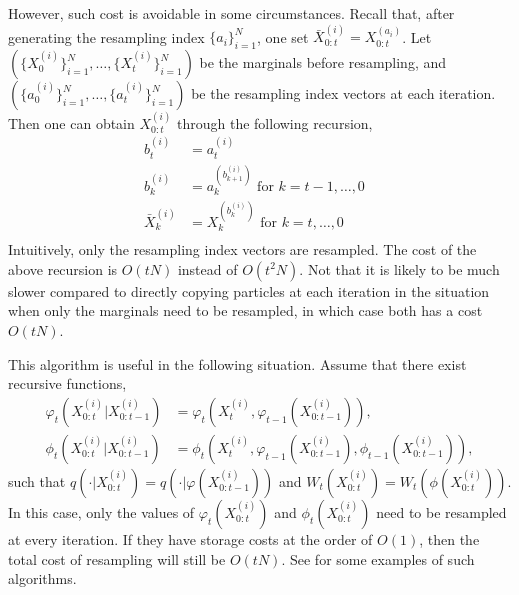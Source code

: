 However, such cost is avoidable in some circumstances. Recall that, after
generating the resampling index $\{a_i\}_{i=1}^N$, one set $\bar{X}_{0:t}^{(i)}
= X_{0:t}^{(a_i)}$. Let $(\{X_0^{(i)}\}_{i=1}^N,\dots,\{X_t^{(i)}\}_{i=1}^N)$
be the marginals before resampling, and
$(\{a_0^{(i)}\}_{i=1}^N,\dots,\{a_t^{(i)}\}_{i=1}^N)$ be the resampling index
vectors at each iteration. Then one can obtain $X_{0:t}^{(i)}$ through
the following recursion,
\begin{align*}
  b_t^{(i)} &= a_t^{(i)} & \\
  b_k^{(i)} &= a_{k}^{(b_{k + 1}^{(i)})} \text{ for } k = t - 1,\dots,0 \\
  \bar{X}_k^{(i)} &= X_k^{(b_k^{(i)})}   \text{ for } k = t,\dots,0\ \\
\end{align*}
Intuitively, only the resampling index vectors are resampled. The cost of the
above recursion is $O(tN)$ instead of $O(t^2N)$. Not that it is likely to be
much slower compared to directly copying particles at each iteration in the
situation when only the marginals need to be resampled, in which case both has
a cost $O(tN)$.

This algorithm is useful in the following situation. Assume that there exist
recursive functions,
\begin{align*}
\varphi_t(X_{0:t}^{(i)}|X_{0:t-1}^{(i)}) &=
\varphi_t(X_t^{(i)}, \varphi_{t-1}(X_{0:t-1}^{(i)})), \\
\phi_t(X_{0:t}^{(i)}|X_{0:t-1}^{(i)}) &=
\phi_t(X_t^{(i)}, \varphi_{t-1}(X_{0:t-1}^{(i)}), \phi_{t-1}(X_{0:t-1}^{(i)})),
\end{align*}
such that
$q(\cdot|X_{0:t}^{(i)}) = q(\cdot|\varphi(X_{0:t-1}^{(i)}))$ and
$W_t(X_{0:t}^{(i)}) = W_t(\phi(X_{0:t}^{(i)}))$. In this case, only the values
of $\varphi_t(X_{0:t}^{(i)})$ and $\phi_t(X_{0:t}^{(i)})$ need to be resampled
at every iteration. If they have storage costs at the order of $O(1)$, then the
total cost of resampling will still be $O(tN)$. See \textcite{stpf} for some
examples of such algorithms.

